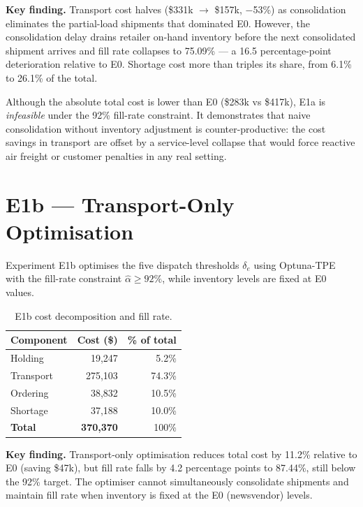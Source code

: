 \textbf{Key finding.}  Transport cost halves (\$331k $\to$ \$157k,
$-$53\%) as consolidation eliminates the partial-load shipments that
dominated E0.  However, the consolidation delay drains retailer on-hand
inventory before the next consolidated shipment arrives and fill rate
collapses to 75.09\% — a 16.5 percentage-point deterioration relative
to E0.  Shortage cost more than triples its share, from 6.1\% to 26.1\%
of the total.

Although the absolute total cost is lower than E0 (\$283k vs \$417k),
E1a is \emph{infeasible} under the 92\% fill-rate constraint.  It
demonstrates that naive consolidation without inventory adjustment is
counter-productive: the cost savings in transport are offset by a
service-level collapse that would force reactive air freight or customer
penalties in any real setting.

\section{E1b --- Transport-Only Optimisation}
\label{sec:results:e1b}

Experiment E1b optimises the five dispatch thresholds $\delta_e$ using
Optuna-TPE with the fill-rate constraint $\hat{\alpha} \geq 92\%$, while
inventory levels are fixed at E0 values.

\begin{table}[htbp]
  \centering
  \caption{E1b cost decomposition and fill rate.}
  \label{tab:e1b}
  \begin{tabular}{@{}lrr@{}}
    \toprule
    Component & Cost (\$) & \% of total \\
    \midrule
    Holding    &  19,247 &  5.2\% \\
    Transport  & 275,103 & 74.3\% \\
    Ordering   &  38,832 & 10.5\% \\
    Shortage   &  37,188 & 10.0\% \\
    \midrule
    \textbf{Total} & \textbf{370,370} & 100\% \\
    \bottomrule
  \end{tabular}
\end{table}

\textbf{Key finding.}  Transport-only optimisation reduces total cost by
11.2\% relative to E0 (saving \$47k), but fill rate falls by 4.2 percentage points to
87.44\%, still below the 92\% target.  The optimiser cannot
simultaneously consolidate shipments and maintain fill rate when
inventory is fixed at the E0 (newsvendor) levels.


